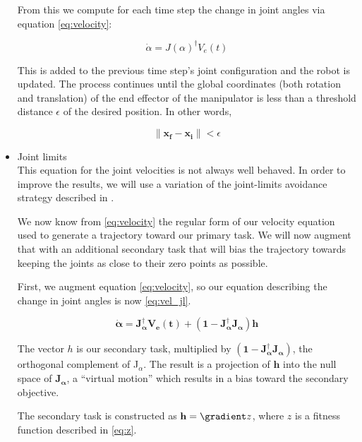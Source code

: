 \documentclass[10pt, conference]{IEEEtran}
\begin{document}
\begin{itemize}
     From this we compute for each time step the change in joint angles
     via equation \ref{eq:velocity}:

     \begin{equation}
     \label{eq:velocity}
     \dot{\alpha} = J(\alpha)^{\dagger}V_e(t)
     \end{equation}

     This is added to the previous time step's joint configuration and
     the robot is updated. The process continues until the global
     coordinates (both rotation and translation) of the end effector
     of the manipulator is less than a threshold distance $\epsilon$
     of the desired position. In other words,

     \begin{equation}
     \label{eq:distance}
     \| \mathbf{x_f - x_i} \| < \epsilon
     \end{equation}


\item Joint limits\\
\label{sec-3-3-1-3}%
This equation for the joint velocities is not always well
     behaved. In order to improve the results, we will use a variation
     of the joint-limits avoidance strategy described in
     \cite{luc_baron}.

     We now know from \ref{eq:velocity} the regular form of our
     velocity equation used to generate a trajectory toward our primary
     task. We will now augment that with an additional secondary task
     that will bias the trajectory towards keeping the joints as close
     to their zero points as possible.

     First, we augment equation \ref{eq:velocity}, so our equation
     describing the change in joint angles is now \ref{eq:vel_jl}.

     \begin{equation}
     \label{eq:vel_jl}
     \mathbf{\dot{\alpha} = J_{\alpha}^{\dagger}V_e(t) + (1 -
     J_{\alpha}^{\dagger}J_{\alpha})h}
     \end{equation}

     The vector \(h\) is our secondary task, multiplied by \(\mathbf{
     (1 - J_{\alpha}^{\dagger}J_{\alpha})}\), the orthogonal complement
     of J$_{\alpha}$. The result is a projection of \(\mathbf{h}\) into
     the null space of \(\mathbf{J_\alpha}\), a ``virtual motion'' which
     results in a bias toward the secondary objective.

     The secondary task is constructed as  \(\mathbf{h} = \gradient z\),
     where \(z\) is a fitness function described in \ref{eq:z}.


\end{itemize}
\end{document}
